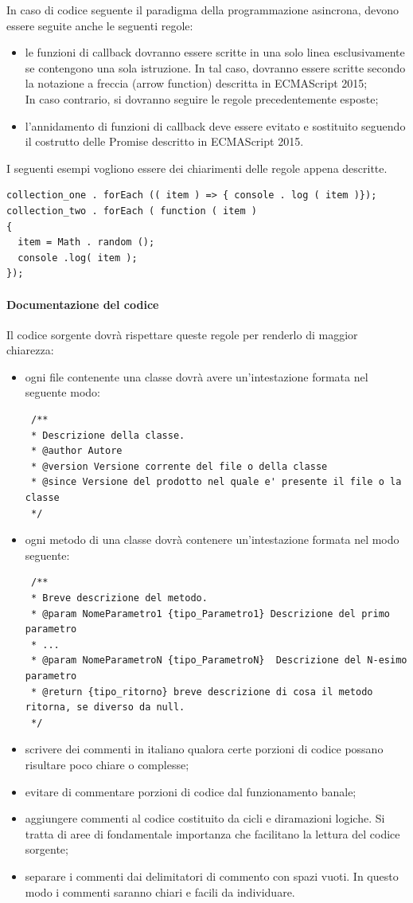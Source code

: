 In caso di codice seguente il paradigma della programmazione asincrona, devono essere seguite anche le seguenti regole:
\begin{itemize}
	\item le funzioni di callback dovranno essere scritte in una solo linea esclusivamente se contengono una sola istruzione. In tal caso, dovranno essere scritte secondo la notazione a freccia (arrow function) descritta in ECMAScript 2015;\\
	 In caso contrario, si dovranno seguire le regole precedentemente esposte;
	 \item l'annidamento di funzioni di callback deve essere evitato e sostituito seguendo il costrutto delle Promise descritto in ECMAScript 2015.
\end{itemize}

I seguenti esempi vogliono essere dei chiarimenti delle regole appena descritte.
\begin{lstlisting}
collection_one . forEach (( item ) => { console . log ( item )});
collection_two . forEach ( function ( item )
{
  item = Math . random ();
  console .log( item );
});
\end{lstlisting}


\paragraph{Documentazione del codice}\label{intestazione}
Il codice sorgente dovrà rispettare queste regole per renderlo di maggior chiarezza:
\begin{itemize}
 \item ogni file contenente una classe dovrà avere un'intestazione formata nel seguente modo:
 \begin{lstlisting}
 /**
 * Descrizione della classe.
 * @author Autore
 * @version Versione corrente del file o della classe
 * @since Versione del prodotto nel quale e' presente il file o la classe
 */
 \end{lstlisting}
 \item ogni metodo di una classe dovrà contenere un'intestazione formata nel modo seguente:
 \begin{lstlisting}
 /**
 * Breve descrizione del metodo.
 * @param NomeParametro1 {tipo_Parametro1} Descrizione del primo parametro
 * ...
 * @param NomeParametroN {tipo_ParametroN}  Descrizione del N-esimo parametro
 * @return {tipo_ritorno} breve descrizione di cosa il metodo ritorna, se diverso da null.
 */

 \end{lstlisting}
 \item scrivere dei commenti in italiano qualora certe porzioni di codice possano risultare poco chiare o complesse;
 \item evitare di commentare porzioni di codice dal funzionamento banale;
 \item aggiungere commenti al codice costituito da cicli e diramazioni logiche. Si tratta di aree
 	di fondamentale importanza che facilitano la lettura del codice sorgente;
 \item separare i commenti dai delimitatori di commento con spazi vuoti. In questo modo i
 	commenti saranno chiari e facili da individuare.
\end{itemize}
